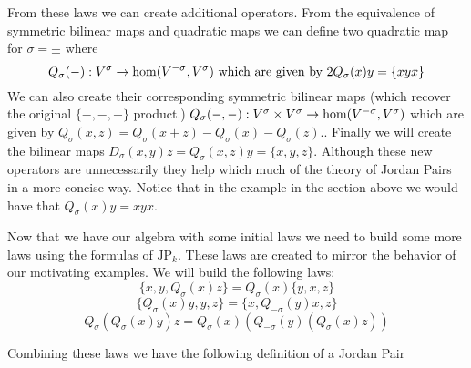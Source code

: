 From these laws we can create additional operators. From the equivalence of symmetric bilinear maps and quadratic maps
we can define two quadratic map for $\sigma=\pm$ where
\[Q_\sigma(-):V^\sigma\rightarrow \hom(V^{-\sigma},V^{\sigma})\text{ which are given by }2Q_\sigma(x)y = \{xyx\}\]
We can also create their corresponding symmetric bilinear maps (which recover the original $\{-,-,-\}$ product.)
$Q_\sigma(-,-):V^\sigma\times V^\sigma\rightarrow \hom(V^{-\sigma},V^{\sigma})$ which are given by 
$Q_\sigma(x,z)=Q_\sigma(x+z)-Q_\sigma(x)-Q_\sigma(z)$.. %
Finally we will create the bilinear maps $D_\sigma(x,y)z=Q_\sigma(x,z)y=\{x,y,z\}$. Although these new operators are
unnecessarily they help which much of the theory of Jordan Pairs in a more concise way.
Notice that in the example in the section above we would have that $Q_\sigma(x)y=xyx$.

Now that we have our algebra with some initial laws we need to build some more laws using the formulas of $\text{JP}_k$.
These laws are created to mirror the behavior of our motivating examples.
We will build the following laws:
\begin{equation}
    \tag{JP1}
    \{x,y,Q_\sigma(x)z\}=Q_\sigma(x)\{y,x,z\}
\end{equation}
\begin{equation}
    \tag{JP2}
    \{Q_\sigma(x)y,y,z\}=\{x,Q_{-\sigma}(y)x,z\}
\end{equation}
\begin{equation}
    \tag{JP3}
    Q_{\sigma}(Q_{\sigma}(x)y)z=Q_{\sigma}(x)(Q_{-\sigma}(y)(Q_{\sigma}(x)z))
\end{equation}


Combining these laws we have the following definition of a Jordan Pair


